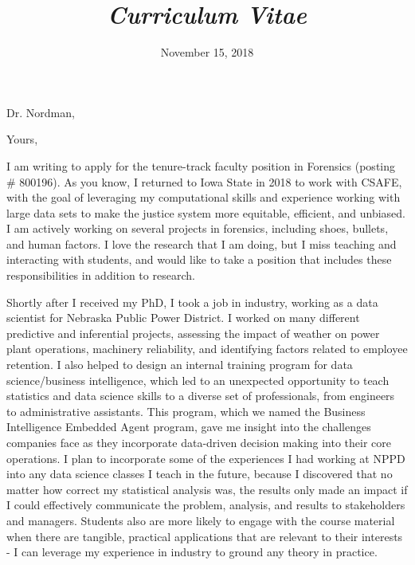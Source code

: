\documentclass[12pt, letterpaper, sans]{moderncv}
\title{\emph{Curriculum Vitae}}
\begin{document}
\date{November 15, 2018}
\opening{Dr. Nordman,}
\closing{Yours,}
\makelettertitle

I am writing to apply for the tenure-track faculty position in Forensics (posting \# 800196). As you know, I returned to Iowa State in 2018 to work with CSAFE, with the goal of leveraging my computational skills and experience working with large data sets to make the justice system more equitable, efficient, and unbiased. I am actively working on several projects in forensics, including shoes, bullets, and human factors. I love the research that I am doing, but I miss teaching and interacting with students, and would like to take a position that includes these responsibilities in addition to research. 

Shortly after I received my PhD, I took a job in industry, working as a data scientist for Nebraska Public Power District. I worked on many different predictive and inferential projects, assessing the impact of weather on power plant operations, machinery reliability, and identifying factors related to employee retention. I also helped to design an internal training program for data science/business intelligence, which led to an unexpected opportunity to teach statistics and data science skills to a diverse set of professionals, from engineers to administrative assistants. This program, which we named the Business Intelligence Embedded Agent program, gave me insight into the challenges companies face as they incorporate data-driven decision making into their core operations. I plan to incorporate some of the experiences I had working at NPPD into any data science classes I teach in the future, because I discovered that no matter how correct my statistical analysis was, the results only made an impact if I could effectively communicate the problem, analysis, and results to stakeholders and managers. Students also are more likely to engage with the course material when there are tangible, practical applications that are relevant to their interests - I can leverage my experience in industry to ground any theory in practice. 
\end{document}
